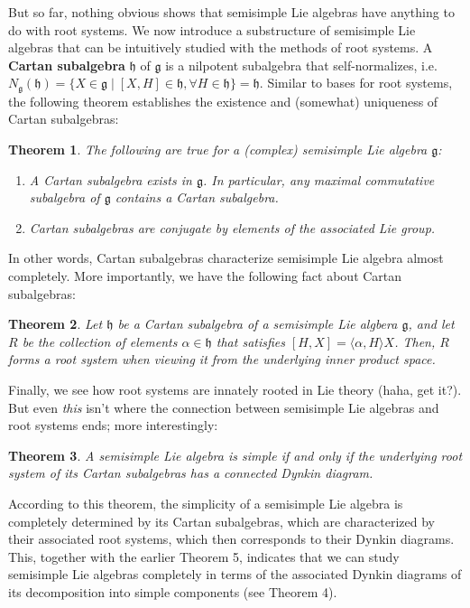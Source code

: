 \documentclass{article}
\newtheorem{theorem}{Theorem}
\theoremstyle{definition}
\begin{document}
But so far, nothing obvious shows that semisimple Lie algebras have anything to do with root systems. We now introduce a substructure of semisimple Lie algebras that can be intuitively studied with the methods of root systems. A \textbf{Cartan subalgebra} $\mathfrak{h}$ of $\mathfrak{g}$ is a nilpotent subalgebra that self-normalizes, i.e. $N_\mathfrak{g}(\mathfrak{h})=\{X\in\mathfrak{g}\mid[X,H]\in\mathfrak{h},\forall H\in\mathfrak{h}\}=\mathfrak{h}$. Similar to bases for root systems, the following theorem establishes the existence and (somewhat) uniqueness of Cartan subalgebras: 
\begin{theorem}
The following are true for a (complex) semisimple Lie algebra $\mathfrak{g}$: 
\begin{enumerate}
    \item A Cartan subalgebra exists in $\mathfrak{g}$. In particular, any maximal commutative subalgebra of $\mathfrak{g}$ contains a Cartan subalgebra. 
    \item Cartan subalgebras are conjugate by elements of the associated Lie group. 
\end{enumerate}
\end{theorem}
In other words, Cartan subalgebras characterize semisimple Lie algebra almost completely. More importantly, we have the following fact about Cartan subalgebras: 
\begin{theorem}
Let $\mathfrak{h}$ be a Cartan subalgebra of a semisimple Lie algbera $\mathfrak{g}$, and let $R$ be the collection of elements $\alpha\in\mathfrak{h}$ that satisfies $[H,X]=\langle\alpha,H\rangle X$. Then, $R$ forms a root system when viewing it from the underlying inner product space. 
\end{theorem}
Finally, we see how root systems are innately rooted in Lie theory (haha, get it?). But even \textit{this} isn't where the connection between semisimple Lie algebras and root systems ends; more interestingly: 
\begin{theorem}
A semisimple Lie algebra is simple if and only if the underlying root system of its Cartan subalgebras has a connected Dynkin diagram. 
\end{theorem}
According to this theorem, the simplicity of a semisimple Lie algebra is completely determined by its Cartan subalgebras, which are characterized by their associated root systems, which then corresponds to their Dynkin diagrams. This, together with the earlier Theorem 5, indicates that we can study semisimple Lie algebras completely in terms of the associated Dynkin diagrams of its decomposition into simple components (see Theorem 4). 
\end{document}
